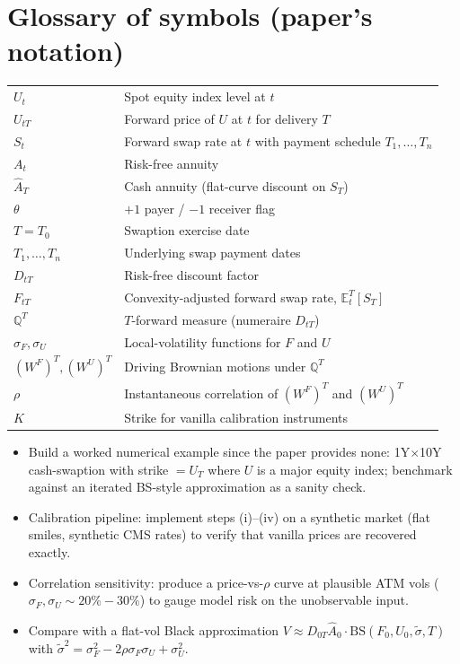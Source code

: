 \documentclass[11pt,a4paper]{article}
\begin{document}
\section{Glossary of symbols (paper's notation)}
\begin{tabular}{@{}p{3cm}p{12cm}@{}}
\toprule
$U_t$                   & Spot equity index level at $t$ \\
$U_{tT}$                & Forward price of $U$ at $t$ for delivery $T$ \\
$S_t$                   & Forward swap rate at $t$ with payment schedule $T_1, \ldots, T_n$ \\
$A_t$                   & Risk-free annuity \\
$\widehat A_T$          & Cash annuity (flat-curve discount on $S_T$) \\
$\theta$                & $+1$ payer / $-1$ receiver flag \\
$T = T_0$               & Swaption exercise date \\
$T_1, \ldots, T_n$      & Underlying swap payment dates \\
$D_{tT}$                & Risk-free discount factor \\
$F_{tT}$                & Convexity-adjusted forward swap rate, $\mathbb{E}^T_t[S_T]$ \\
$\mathbb{Q}^T$          & $T$-forward measure (numeraire $D_{tT}$) \\
$\sigma_F, \sigma_U$    & Local-volatility functions for $F$ and $U$ \\
$(W^F)^T, (W^U)^T$      & Driving Brownian motions under $\mathbb{Q}^T$ \\
$\rho$                  & Instantaneous correlation of $(W^F)^T$ and $(W^U)^T$ \\
$K$                     & Strike for vanilla calibration instruments \\
\bottomrule
\end{tabular}

\begin{todobox}
\begin{itemize}[noitemsep]
  \item Build a worked numerical example since the paper provides
        none: 1Y$\times$10Y cash-swaption with strike $= U_T$ where
        $U$ is a major equity index; benchmark against an iterated
        BS-style approximation as a sanity check.
  \item Calibration pipeline: implement steps (i)--(iv) on a synthetic
        market (flat smiles, synthetic CMS rates) to verify that
        vanilla prices are recovered exactly.
  \item Correlation sensitivity: produce a price-vs-$\rho$ curve at
        plausible ATM vols ($\sigma_F, \sigma_U \sim 20\%-30\%$) to
        gauge model risk on the unobservable input.
  \item Compare with a flat-vol Black approximation
        $V \approx D_{0T} \widehat A_0 \cdot \text{BS}(F_0, U_0, \tilde\sigma, T)$
        with $\tilde\sigma^2 = \sigma_F^2 - 2\rho\sigma_F\sigma_U + \sigma_U^2$.
\end{itemize}
\end{todobox}
\end{document}
